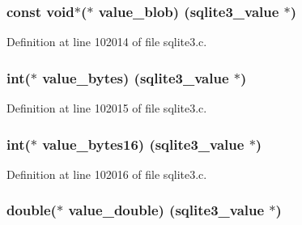 \subsubsection[{value\+\_\+blob}]{\setlength{\rightskip}{0pt plus 5cm}const void$\ast$($\ast$ value\+\_\+blob) (sqlite3\+\_\+value $\ast$)}\label{structsqlite3__api__routines_af0cad7cef3019e2ab150b694894b65ec}


Definition at line 102014 of file sqlite3.\+c.

\hypertarget{structsqlite3__api__routines_a47dbf2fc0d87899ecc9651b11c7adb90}{}
\subsubsection[{value\+\_\+bytes}]{\setlength{\rightskip}{0pt plus 5cm}int($\ast$ value\+\_\+bytes) (sqlite3\+\_\+value $\ast$)}\label{structsqlite3__api__routines_a47dbf2fc0d87899ecc9651b11c7adb90}


Definition at line 102015 of file sqlite3.\+c.

\hypertarget{structsqlite3__api__routines_a1a066bfc11cb88a8c2036831b0a4e113}{}
\subsubsection[{value\+\_\+bytes16}]{\setlength{\rightskip}{0pt plus 5cm}int($\ast$ value\+\_\+bytes16) (sqlite3\+\_\+value $\ast$)}\label{structsqlite3__api__routines_a1a066bfc11cb88a8c2036831b0a4e113}


Definition at line 102016 of file sqlite3.\+c.

\hypertarget{structsqlite3__api__routines_a3a64abf666b3ecab7caf669701004db4}{}
\subsubsection[{value\+\_\+double}]{\setlength{\rightskip}{0pt plus 5cm}double($\ast$ value\+\_\+double) (sqlite3\+\_\+value $\ast$)}\label{structsqlite3__api__routines_a3a64abf666b3ecab7caf669701004db4}


